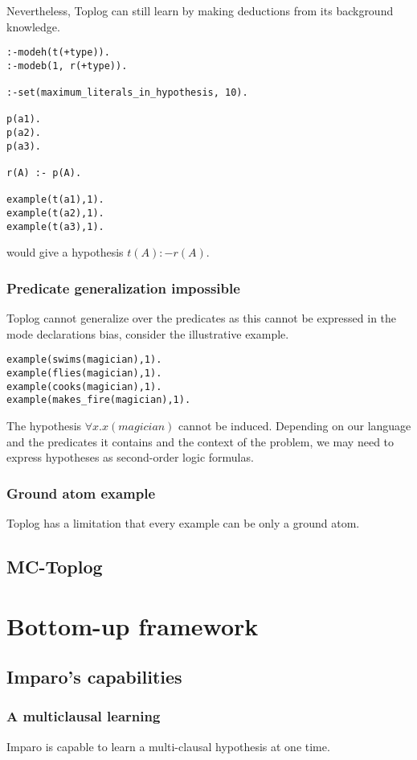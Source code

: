 Nevertheless, Toplog can still learn by making deductions from its background knowledge.

\begin{lstlisting}
:-modeh(t(+type)).
:-modeb(1, r(+type)).

:-set(maximum_literals_in_hypothesis, 10).

p(a1).
p(a2).
p(a3).

r(A) :- p(A).

example(t(a1),1).
example(t(a2),1).
example(t(a3),1).
\end{lstlisting}
would give a hypothesis $t(A) :- r(A).$

\subsection{Predicate generalization impossible}
Toplog cannot generalize over the predicates as this cannot be expressed in the mode declarations bias, consider the illustrative example.
\begin{lstlisting}
example(swims(magician),1).
example(flies(magician),1).
example(cooks(magician),1).
example(makes_fire(magician),1).
\end{lstlisting}
The hypothesis $\forall x. x(magician)$ cannot be induced. Depending on our language and the predicates it contains and the context of the problem, we may need to express hypotheses as second-order logic formulas.

\subsection{Ground atom example}
Toplog has a limitation that every example can be only a ground atom.

\section{MC-Toplog}


\chapter{Bottom-up framework}

\section{Imparo's capabilities}
\subsection{A multiclausal learning}
Imparo is capable to learn a multi-clausal hypothesis at one time.

